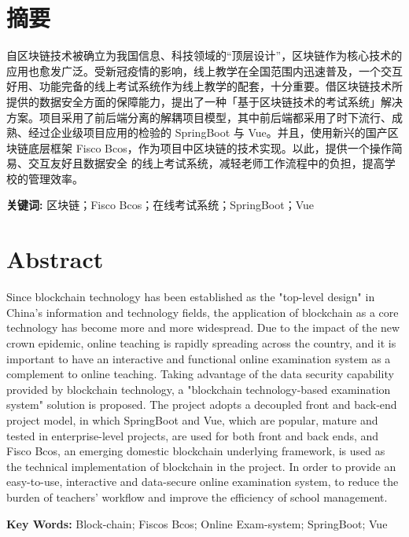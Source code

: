 \section*{\centering 摘要}
\vskip0.5cm
自区块链技术被确立为我国信息、科技领域的“顶层设计”，区块链作为核心技术的应用也愈发广泛。受新冠疫情的影响，线上教学在全国范围内迅速普及，一个交互好用、功能完备的线上考试系统作为线上教学的配套，十分重要。借区块链技术所提供的数据安全方面的保障能力，提出了一种「基于区块链技术的考试系统」解决方案。项目采用了前后端分离的解耦项目模型，其中前后端都采用了时下流行、成熟、经过企业级项目应用的检验的 SpringBoot 与 Vue。并且，使用新兴的国产区块链底层框架 Fisco Bcos，作为项目中区块链的技术实现。以此，提供一个操作简易、交互友好且数据安全  的线上考试系统，减轻老师工作流程中的负担，提高学校的管理效率。

\textbf{关键词:} 区块链；Fisco Bcos；在线考试系统；SpringBoot；Vue

\clearpage  %

\section*{\centering \textbf{Abstract}}
\vskip0.5cm
Since blockchain technology has been established as the "top-level design" in China's information and technology fields, the application of blockchain as a core technology has become more and more widespread. Due to the impact of the new crown epidemic, online teaching is rapidly spreading across the country, and it is important to have an interactive and functional online examination system as a complement to online teaching. Taking advantage of the data security capability provided by blockchain technology, a "blockchain technology-based examination system" solution is proposed. The project adopts a decoupled front and back-end project model, in which SpringBoot and Vue, which are popular, mature and tested in enterprise-level projects, are used for both front and back ends, and Fisco Bcos, an emerging domestic blockchain underlying framework, is used as the technical implementation of blockchain in the project. In order to provide an easy-to-use, interactive and data-secure online examination system, to reduce the burden of teachers' workflow and improve the efficiency of school management.

\textbf{Key Words:} Block-chain; Fiscos Bcos; Online Exam-system; SpringBoot; Vue
